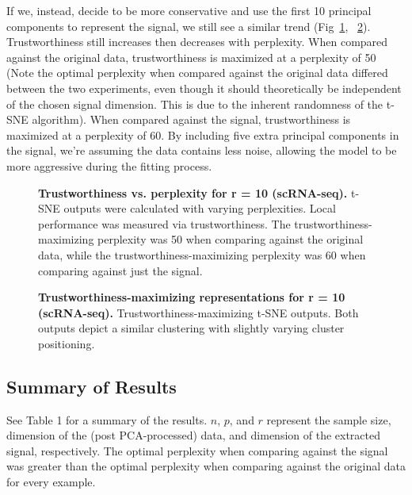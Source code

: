 \documentclass[10pt,letterpaper]{article}
\begin{document}
If we, instead, decide to be more conservative and use the first 10 principal components to represent the signal, we still see a similar trend (Fig~\ref{fig12}, ~\ref{fig13}). Trustworthiness still increases then decreases with perplexity. When compared against the original data, trustworthiness is maximized at a perplexity of 50 (Note the optimal perplexity when compared against the original data differed between the two experiments, even though it should theoretically be independent of the chosen signal dimension. This is due to the inherent randomness of the t-SNE algorithm). When compared against the signal, trustworthiness is maximized at a perplexity of 60. By including five extra principal components in the signal, we're assuming the data contains less noise, allowing the model to be more aggressive during the fitting process.

\begin{figure}[!h]
\caption{{\bf Trustworthiness vs. perplexity for r = 10 (scRNA-seq).}
t-SNE outputs were calculated with varying perplexities. Local performance was measured via trustworthiness. The trustworthiness-maximizing perplexity was 50 when comparing against the original data, while the trustworthiness-maximizing perplexity was 60 when comparing against just the signal.}
\label{fig12}
\end{figure}

\begin{figure}[!h]
\caption{{\bf Trustworthiness-maximizing representations for r = 10 (scRNA-seq).}
Trustworthiness-maximizing t-SNE outputs. Both outputs depict a similar clustering with slightly varying cluster positioning.}
\label{fig13}
\end{figure}

\subsection*{Summary of Results}
See Table 1 for a summary of the results. $n$, $p$, and $r$ represent the sample size, dimension of the (post PCA-processed) data, and dimension of the extracted signal, respectively. The optimal perplexity when comparing against the signal was greater than the optimal perplexity when comparing against the original data for every example.
\end{document}
